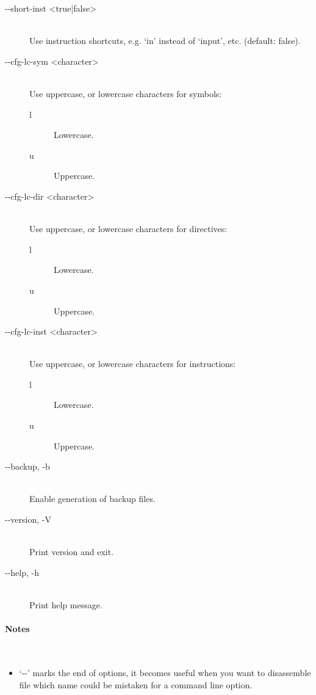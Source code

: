 \begin{description}
            \item[-{}-short-inst <true|false>]~\\
                Use instruction shortcuts, e.g. `in' instead of `input', etc. (default: false).

            \item[-{}-cfg-lc-sym <character>]~\\
                Use uppercase, or lowercase characters for symbols:
                \begin{description}
                    \item [l] Lowercase.
                    \item [u] Uppercase.
                \end{description}

            \item[-{}-cfg-lc-dir <character>]~\\
                Use uppercase, or lowercase characters for directives:
                \begin{description}
                    \item [l] Lowercase.
                    \item [u] Uppercase.
                \end{description}

            \item[-{}-cfg-lc-inst <character>]~\\
                Use uppercase, or lowercase characters for instructions:
                \begin{description}
                    \item [l] Lowercase.
                    \item [u] Uppercase.
                \end{description}

            \item[-{}-backup, -b]~\\
                Enable generation of backup files.

            \item[-{}-version, -V]~\\
                Print version and exit.

            \item[-{}-help, -h]~\\
                Print help message.
        \end{description}

    \paragraph{Notes}~\\
        \begin{itemize}
            \item `-{}-' marks the end of options, it becomes useful when you want to disassemble file which name could be mistaken for a command line option.
        \end{itemize}

